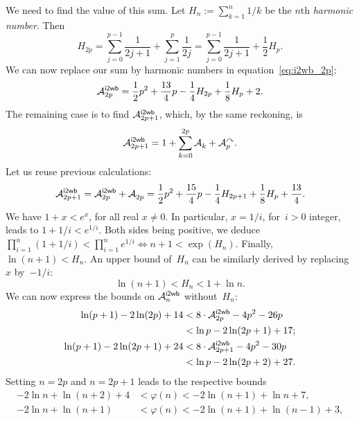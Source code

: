 We need to find the value of this sum. Let \(H_n :=
\sum_{k=1}^n{1/k}\) be the \(n\)th \emph{harmonic
  number}. Then
\begin{equation*}
H_{2p} = \sum_{j=0}^{p-1}{\frac{1}{2j+1}} + \sum_{j=1}^{p}{\frac{1}{2j}}
      = \sum_{j=0}^{p-1}{\frac{1}{2j+1}} + \frac{1}{2}{H_{p}}.
\end{equation*}
We can now replace our sum by harmonic numbers in
equation~\eqref{eq:i2wb_2p}:
\begin{equation*}
\M{\fun{i2wb}}{2p}
  = \frac{1}{2}{p^2} + \frac{13}{4}{p} - \frac{1}{4}{H_{2p}}
    + \frac{1}{8}{H_p} + 2.
\end{equation*}
The remaining case is to find \(\M{\fun{i2wb}}{2p+1}\), which, by the
same reckoning, is
\begin{equation*}
\M{\fun{i2wb}}{2p+1}
  = 1 + \sum_{k=0}^{2p}{\M{}{k}} + \M{\curvearrowright}{p}.
\end{equation*}
Let us reuse previous calculations:
\begin{equation*}
\M{\fun{i2wb}}{2p+1}
   = \M{\fun{i2wb}}{2p} + \M{}{2p}
   = \frac{1}{2}{p^2} + \frac{15}{4}{p} - \frac{1}{4}{H_{2p+1}}
     + \frac{1}{8}{H_p} + \frac{13}{4}.
\end{equation*}
We have \(1 + x < e^x\), for all real \(x \neq 0\). In particular,
\(x=1/i\), for~\(i>0\) integer, leads to \(1 + 1/i < e^{1/i}\). Both
sides being positive, we deduce \(\prod_{i=1}^{n}(1+1/i) <
\prod_{i=1}^{n}{e^{1/i}} \Leftrightarrow n+1 < \exp(H_n)\). Finally,
\(\ln(n+1) < H_n\). An upper bound of~\(H_n\) can be similarly derived
by replacing~\(x\) by~\(-1/i\):
\begin{equation}
\ln(n+1) < H_n < 1 + \ln n.\label{ineq:Hn}
\end{equation}
We can now express the bounds on
\(\M{\fun{i2wb}}{n}\) without~\(H_n\):
\begin{align*}
\ln(p+1) - 2\ln(2p) + 14
&< 8 \cdot \M{\fun{i2wb}}{2p} - 4{p^2} - 26{p}\\
& < \ln p - 2\ln(2p+1) + 17;\\
\ln(p+1) - 2\ln(2p+1) + 24
&< 8 \cdot \M{\fun{i2wb}}{2p+1} - 4{p^2} - 30{p}\\
&< \ln{p} - 2\ln(2p+2) + 27.
\end{align*}
Setting \(n=2p\) and \(n=2p+1\) leads to the respective bounds
\begin{align*}
-2\ln n + \ln(n+2) + 4 &< \varphi(n) < -2\ln(n+1) + \ln n + 7,\\
-2\ln n + \ln(n+1)     &< \varphi(n) < -2\ln(n+1) + \ln(n-1) + 3,
\end{align*}
